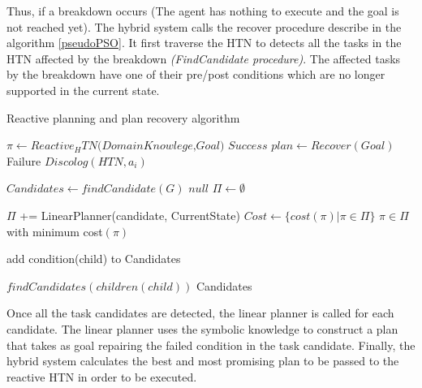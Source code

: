 \documentclass[conference]{IEEEtran}
\begin{document}
		\par Thus, if a breakdown occurs (The agent has nothing to execute and the goal is not reached yet). The hybrid system calls the recover procedure describe in the algorithm \ref{pseudoPSO}. It first traverse the HTN to detects all the tasks in the HTN affected by the breakdown \emph{(FindCandidate procedure)}. The affected tasks by the breakdown have one of their pre/post conditions which are no longer supported in the current state.
		\begin{algorithm}
			\caption{ Reactive planning and plan recovery algorithm}
			\label{pseudoPSO}
			\begin{algorithmic}[1]
				\State $\pi \gets Reactive_HTN \textit{(DomainKnowlege,Goal)}$
				\State \Return $\textit{Success} $
				\Else 
				\State$ plan \gets Recover(Goal)$
				\State \Return Failure
				\Else 
				\State  $\textit{Discolog} (HTN,a_i) $
				\EndFor
				\EndIf
				\EndIf
				
				\EndProcedure 
				
				
				
				\State $\textit{Candidates}\gets\textit{findCandidate}{(G)} $
				\State \Return $\textit{null} $
				\Else 
				\State $\Pi \gets \emptyset$
				
				\State $\Pi$ += LinearPlanner(candidate, CurrentState)
				\State  $Cost \gets \{ cost(\pi) | \pi \in  \Pi \} $
				\EndFor
				\EndIf
				\State \Return $\pi \in \Pi$  with minimum cost$(\pi)$
				
				\EndProcedure
				
				
				
				\State   add condition(child) to Candidates
				\EndIf
				
				\State $\textit{findCandidates} (children(child))$
				\EndFor
				\State \Return Candidates
				
				\EndProcedure 
			\end{algorithmic}
		\end{algorithm}
		Once all the task candidates are detected, the linear planner is called for each candidate. The linear planner uses the symbolic knowledge to  construct a plan that takes as goal repairing the failed condition in the task candidate. Finally, the hybrid system calculates the best and most promising  plan to be passed to the reactive HTN in order to be executed. 
		
\end{document}

